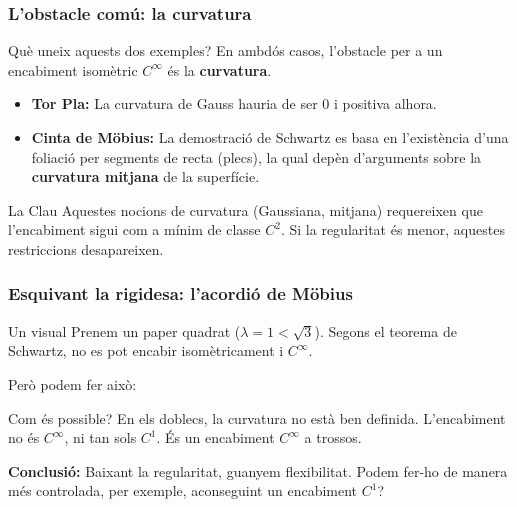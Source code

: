 \documentclass[10pt]{beamer}
\begin{document}
\begin{frame}
    \frametitle{L'obstacle comú: la curvatura}
    
    \begin{block}{Què uneix aquests dos exemples?}
        En ambdós casos, l'obstacle per a un encabiment isomètric $C^\infty$ és la \textbf{curvatura}.
        \begin{itemize}
            \item \textbf{Tor Pla:} La curvatura de Gauss hauria de ser 0 i positiva alhora.
            \pause
            \item \textbf{Cinta de Möbius:} La demostració de Schwartz es basa en l'existència d'una foliació per segments de recta (plecs), la qual depèn d'arguments sobre la \textbf{curvatura mitjana} de la superfície.
        \end{itemize}
    \end{block}
    \pause
    \begin{alertblock}{La Clau}
        Aquestes nocions de curvatura (Gaussiana, mitjana) requereixen que l'encabiment sigui com a mínim de classe $C^2$. Si la regularitat és menor, aquestes restriccions desapareixen.
    \end{alertblock}
    
\end{frame}

\begin{frame}
    \frametitle{Esquivant la rigidesa: l'acordió de Möbius}

    \begin{block}{Un  visual}
        Prenem un paper quadrat ($\lambda=1 < \sqrt{3}$). Segons el teorema de Schwartz, no es pot encabir isomètricament i $C^\infty$.
        
        Però podem fer això:
    \end{block}
    
      \begin{figure}
          \centering
      \end{figure}
    \pause
    
    \begin{alertblock}{Com és possible?}
        En els doblecs, la curvatura no està ben definida. L'encabiment no és $C^\infty$, ni tan sols $C^1$. És un encabiment $C^\infty$ a trossos.
        
        \textbf{Conclusió:} Baixant la regularitat, guanyem flexibilitat. Podem fer-ho de manera més controlada, per exemple, aconseguint un encabiment $C^1$?
    \end{alertblock}

\end{frame}
\end{document}

